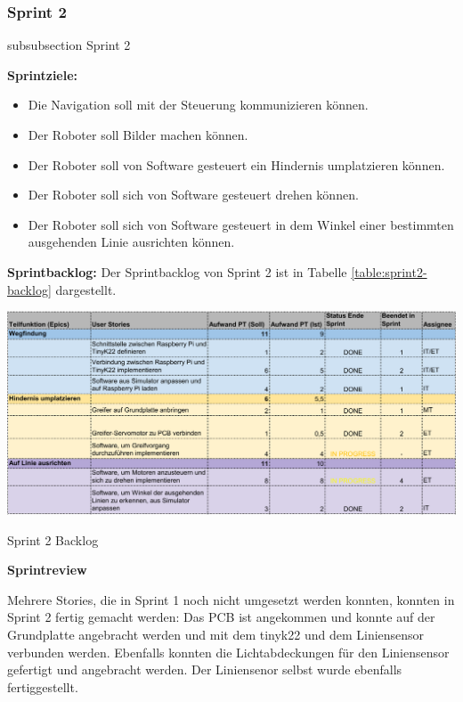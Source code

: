 \newpage



\subsubsection*{Sprint 2}
    {subsubsection}
    {Sprint 2}
    
\textbf{Sprintziele:}
\begin{itemize}
    \item Die Navigation soll mit der Steuerung kommunizieren können.
    \item Der Roboter soll Bilder machen können.
    \item Der Roboter soll von Software gesteuert ein Hindernis umplatzieren können.
    \item Der Roboter soll sich von Software gesteuert drehen können.
    \item Der Roboter soll sich von Software gesteuert in dem Winkel einer bestimmten ausgehenden Linie ausrichten können.
\end{itemize}

\textbf{Sprintbacklog:} Der Sprintbacklog von Sprint 2 ist in Tabelle 
\ref{table:sprint2-backlog} 
dargestellt.

\begin{table}[H]
\centering
\includegraphics[width=\textwidth]{assets/projektmanagement/sprint2-crop.pdf}
\caption{Sprint 2 Backlog}
\label{table:sprint2-backlog}
\end{table}


\textbf{Sprintreview}

Mehrere Stories, die in Sprint 1 noch nicht umgesetzt werden konnten, konnten in Sprint 2 fertig gemacht werden: Das PCB ist angekommen und konnte auf der Grundplatte angebracht werden und mit dem \gls{tinyk22} und dem Liniensensor verbunden werden. Ebenfalls konnten die Lichtabdeckungen für den Liniensensor gefertigt und angebracht werden. Der Liniensenor selbst wurde ebenfalls fertiggestellt.

